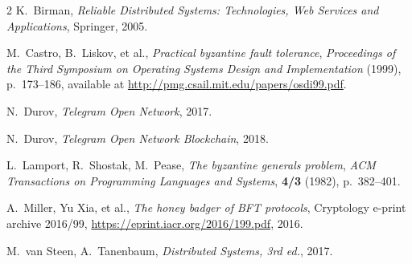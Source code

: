 \documentclass[12pt,oneside]{article}
\def\markbothsame#1{\fancyhead[C]{#1}}
\begin{document}
%
%
%
%

\clearpage
\markbothsame{\textsc{References}}

\begin{thebibliography}{2}
  {\sc K.~Birman}, {\sl Reliable Distributed Systems: Technologies, Web Services and Applications}, Springer, 2005.

  {\sc M.~Castro, B.~Liskov, et al.}, {\sl Practical byzantine fault tolerance}, {\it Proceedings of the Third Symposium on Operating Systems Design and Implementation\/} (1999), p.~173--186, available at \url{http://pmg.csail.mit.edu/papers/osdi99.pdf}.

  {\sc N.~Durov}, {\sl Telegram Open Network}, 2017.

  {\sc N.~Durov}, {\sl Telegram Open Network Blockchain}, 2018.

  {\sc L.~Lamport, R.~Shostak, M.~Pease}, {\sl The byzantine generals problem}, {\it ACM Transactions on Programming Languages and Systems}, {\bf 4/3} (1982), p.~382--401.

  {\sc A.~Miller, Yu Xia, et al.}, {\sl The honey badger of BFT protocols}, Cryptology e-print archive 2016/99, \url{https://eprint.iacr.org/2016/199.pdf}, 2016.

  {\sc M.~van Steen, A.~Tanenbaum}, {\sl Distributed Systems, 3rd ed.}, 2017.
\end{thebibliography}
\end{document}
